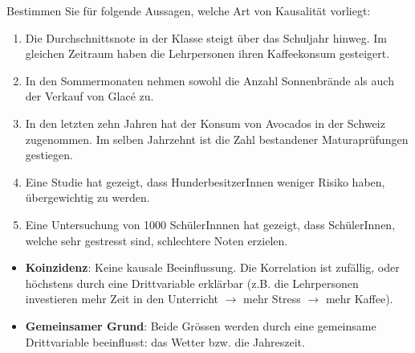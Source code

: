 \begin{myexercise}
	Bestimmen Sie für folgende Aussagen, welche Art von Kausalität vorliegt:

	\begin{enumerate}
		\item Die Durchschnittsnote in der Klasse steigt über das Schuljahr hinweg. Im gleichen Zeitraum haben die Lehrpersonen ihren Kaffeekonsum gesteigert.
		\item In den Sommermonaten nehmen sowohl die Anzahl Sonnenbrände als auch der Verkauf von Glacé zu.
		\item In den letzten zehn Jahren hat der Konsum von Avocados in der Schweiz zugenommen. Im selben Jahrzehnt ist die Zahl bestandener Maturaprüfungen gestiegen.
		\item Eine Studie hat gezeigt, dass HunderbesitzerInnen weniger Risiko haben, übergewichtig zu werden.
		\item Eine Untersuchung von 1000 SchülerInnnen hat gezeigt, dass SchülerInnen, welche sehr gestresst sind, schlechtere Noten erzielen.
	\end{enumerate}

	\begin{myanswer}
		\begin{itemize}
			\item \textbf{Koinzidenz}: Keine kausale Beeinflussung. Die Korrelation ist zufällig, oder höchstens durch eine Drittvariable erklärbar (z.B. die Lehrpersonen investieren mehr Zeit in den Unterricht $\rightarrow$ mehr Stress $\rightarrow$ mehr Kaffee).
			      \begin{center}
			      \end{center}

			\item \textbf{Gemeinsamer Grund}: Beide Grössen werden durch eine gemeinsame Drittvariable beeinflusst: das Wetter bzw. die Jahreszeit.
			      \begin{center}
			      \end{center}


\end{itemize}
\end{myanswer}
\end{myexercise}
